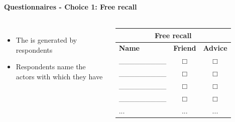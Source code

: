 \documentclass[8pt]{beamer}
\begin{document}

\begin{frame}
\frametitle{\insertsection}
\framesubtitle{Questionnaires - Choice 1: Free recall}

\begin{columns}[c]

\begin{itemize}
\item The {\color{blue}{list of names}} is generated by respondents
\item Respondents name the actors with which they have {\color{blue}{certain ties}}

\end{itemize} 


\footnotesize
\centering
\begin{tabular}{lcc}
\multicolumn{3}{c}{\textbf{Free recall}} \\
\toprule
\textbf{Name} & \textbf{Friend} & \textbf{Advice}\\
\hline
\_\_\_\_\_\_\_\_\_        &$\Box$    &$\Box$  \\
\_\_\_\_\_\_\_\_\_        &$\Box$    &$\Box$  \\
\_\_\_\_\_\_\_\_\_        &$\Box$    &$\Box$  \\
\_\_\_\_\_\_\_\_\_        &$\Box$    &$\Box$  \\
...                		  &...       &...  \\
\bottomrule
\end{tabular}

\end{columns}

\end{frame}

\end{document}
